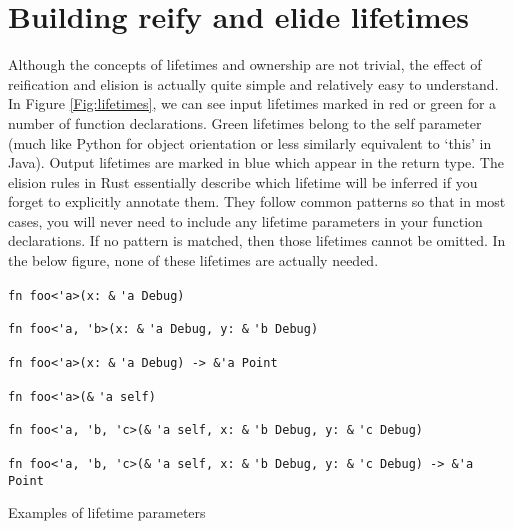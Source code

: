 
\section{Building reify and elide lifetimes}\label{S:buildreielide}
Although the concepts of lifetimes and ownership are not trivial, the effect of reification and elision is actually quite simple and relatively easy to understand. In Figure \ref{Fig:lifetimes}, we can see input lifetimes marked in red or green for a number of function declarations. Green lifetimes belong to the self parameter (much like Python for object orientation or less similarly equivalent to `this' in Java). Output lifetimes are marked in blue which appear in the return type. The elision rules in Rust essentially describe which lifetime will be inferred if you forget to explicitly annotate them. They follow common patterns so that in most cases, you will never need to include any lifetime parameters in your function declarations. If no pattern is matched, then those lifetimes cannot be omitted. In the below figure, none of these lifetimes are actually needed.

\begin{fig}
{\verb|fn foo<'a>(x: &|}
{\color{red} \verb|'a|}{\verb| Debug)|}

{\verb|fn foo<'a, 'b>(x: &|}
{\color{red} \verb|'a|}{\verb| Debug, y: &|}{\color{red} \verb|'b|}{\verb| Debug)|}

{\verb|fn foo<'a>(x: &|}
{\color{red} \verb|'a|}{\verb| Debug) -> &|}{\color{blue}\verb|'a|}{\verb| Point|}

{\verb|fn foo<'a>(&|}
{\color{green} \verb|'a|}{\verb| self)|}

{\verb|fn foo<'a, 'b, 'c>(&|}
{\color{green} \verb|'a|}{\verb| self, x: &|}{\color{red} \verb|'b|}{\verb| Debug, y: &|}
{\color{red} \verb|'c|}{\verb| Debug)|}

{\verb|fn foo<'a, 'b, 'c>(&|}
{\color{green} \verb|'a|}{\verb| self, x: &|}{\color{red} \verb|'b|}{\verb| Debug, y: &|}
{\color{red}\verb|'c|}{\verb| Debug) -> &|}{\color{blue}\verb|'a|}{\verb| Point|}

\caption{Examples of lifetime parameters}
\label{Fig:lifetimes}
\end{fig}

